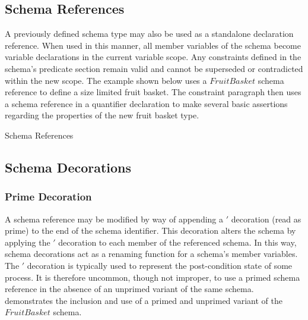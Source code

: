 \documentclass[letterpaper,10pt,draft]{book}
\begin{document}
\subsection{Schema References}
   \label{sect:SchemaRef}

A previously defined schema type may also be used as a standalone declaration reference.
When used in this manner, all member variables of the schema become variable declarations
in the current variable scope.  Any constraints defined in the schema's predicate
section remain valid and cannot be superseded or contradicted within the new scope.
The example shown below uses a $FruitBasket$ schema reference to define a size limited
fruit basket.  The constraint paragraph then uses a schema reference in a quantifier
declaration to make several basic assertions regarding the properties of the new
fruit basket type.

\begin{example}
\begin{minipage}[t]{0.49\linewidth}
   
\end{minipage}
\begin{minipage}[t]{0.49\linewidth}
   \azsch
   
\end{minipage}

   \caption{Schema References}
   \label{ex:SchemaRef}
\end{example}

\subsection{Schema Decorations}
   \label{sect:SchDecor}

\subsubsection{Prime Decoration}
   \label{sect:PrimeDecor}

A schema reference may be modified by way of appending a $'$ decoration (read as
prime) to the end of the schema identifier.  This decoration alters the schema by
applying the $'$ decoration to each member of the referenced schema.  In this way,
schema decorations act as a renaming function for a schema's member variables.
The $'$ decoration is typically used to represent the post-condition state of some
process.  It is therefore uncommon, though not improper, to use a primed schema
reference in the absence of an unprimed variant of the same schema.  
demonstrates the inclusion and use of a primed and unprimed variant of the $FruitBasket$
schema.
\end{document}
